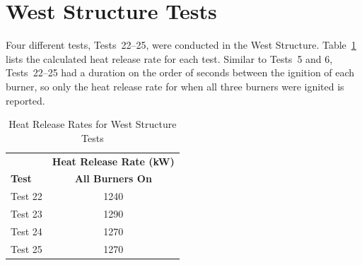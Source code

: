 \documentclass[12pt,oneside]{book}
\begin{document}
\section{West Structure Tests}
\label{sec:west_procedure}
Four different tests, Tests~22--25, were conducted in the West Structure. Table~\ref{table:HRR_West} lists the calculated heat release rate for each test. Similar to Tests~5 and 6, Tests~22--25 had a duration on the order of seconds between the ignition of each burner, so only the heat release rate for when all three burners were ignited is reported.

\begin{table}[!ht]
\caption{Heat Release Rates for West Structure Tests}
\begin{tabular}{lc}
 \toprule
					& 	\textbf{Heat Release Rate (kW)}	\\
\textbf{Test}		& \textbf{All Burners On} \\
 \midrule
Test 22				&     	1240 	  \\
Test 23				&     	1290 	  \\
Test 24				& 	    1270 	  \\
Test 25				&     	1270 	  \\
\bottomrule
\end{tabular}
\label{table:HRR_West}
\end{table}
\end{document}
